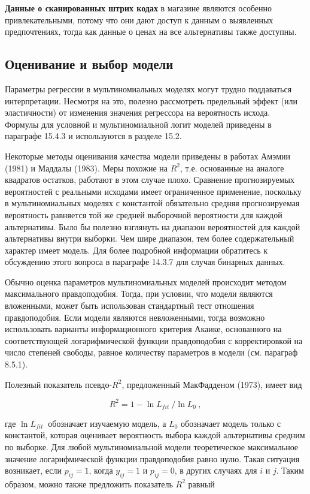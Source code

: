 \textbf{Данные о сканированных штрих кодах} в магазине являются особенно привлекательными, потому что они дают доступ к данным о выявленных предпочтениях, тогда как данные о ценах на все альтернативы также доступны.

\subsection{Оценивание и выбор модели}

Параметры регрессии в мультиномиальных моделях могут трудно поддаваться интерпретации. Несмотря на это, полезно рассмотреть предельный эффект (или эластичности) от изменения значения регрессора на вероятность исхода. Формулы для условной и мультиномиальной логит моделей приведены в параграфе 15.4.3 и используются в разделе 15.2.

Некоторые методы оценивания качества модели приведены в работах Амэмии (1981) и Маддалы (1983). Меры похожие на $R^2$, т.е. основанные на аналоге квадратов остатков, работают в этом случае плохо. Сравнение прогнозируемых вероятностей с реальными исходами имеет ограниченное применение, поскольку в мультиномиальных моделях с константой обязательно средняя прогнозируемая вероятность равняется той же средней выборочной вероятности для каждой альтернативы. Было бы полезно взглянуть на диапазон вероятностей для каждой альтернативы внутри выборки. Чем шире диапазон, тем более содержательный характер имеет модель. Для более подробной информации обратитесь к обсуждению этого вопроса в параграфе 14.3.7 для случая бинарных данных.

Обычно оценка параметров мультиномиальных моделей происходит методом максимального правдоподобия. Тогда, при условии, что модели являются вложенными, может быть использован стандартный тест отношения правдоподобия. Если модели являются невложенными, тогда возможно использовать варианты информационного критерия Акаике, основанного на соответствующей логарифмической функции правдоподобия с корректировкой на число степеней свободы, равное количеству параметров в модели (см. параграф 8.5.1).

Полезный показатель псевдо-$R^2$, предложенный МакФадденом (1973), имеет вид

\begin{equation} \label{GrindEQ__15_9_} 
R^2=1-{{\ln  L_{fit}\ }}/{{\ln  L_0\ },} 
\end{equation} 

где ${\ln  L_{fit}\ }$ обозначает изучаемую модель, а $L_0$ обозначает модель только с константой, которая оценивает вероятность выбора каждой альтернативы  средним по выборке. Для любой мультиномиальной модели теоретическое максимальное значение логарифмической функции правдоподобия равно нулю. Такая ситуация возникает, если $p_{ij}=1$, когда $y_{ij}=1$ и $p_{ij}=0$, в других случаях для $i$ и $j$. Таким образом, можно также предложить показатель $R^2$ равный

